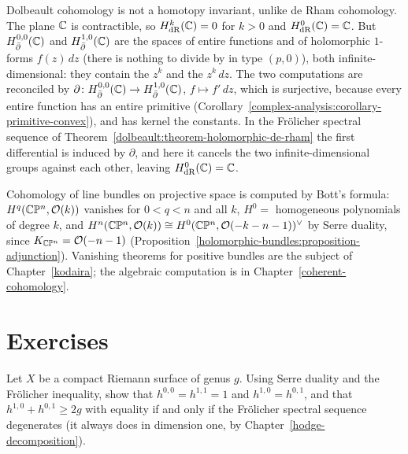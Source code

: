 \begin{counterexample}\label{dolbeault:counterexample-not-homotopy-invariant}
Dolbeault cohomology is not a homotopy invariant, unlike de Rham cohomology. The plane $\mathbb{C}$ is contractible, so $H^k_{\mathrm{dR}}(\mathbb{C}) = 0$ for $k > 0$ and $H^0_{\mathrm{dR}}(\mathbb{C}) = \mathbb{C}$. But
$H^{0,0}_{\bar\partial}(\mathbb{C})$ and $H^{1,0}_{\bar\partial}(\mathbb{C})$ are the spaces of entire functions and of holomorphic $1$-forms $f(z)\,dz$ (there is nothing to divide by in type $(p,0)$), both
infinite-dimensional: they contain the $z^k$ and the $z^k\,dz$. The two computations are reconciled by $\partial \colon H^{0,0}_{\bar\partial}(\mathbb{C}) \to H^{1,0}_{\bar\partial}(\mathbb{C})$, $f \mapsto f'\,dz$, which is
surjective, because every entire function has an entire primitive (Corollary~\ref{complex-analysis:corollary-primitive-convex}), and has kernel the constants. In the Fr\"olicher spectral sequence of Theorem~\ref{dolbeault:theorem-holomorphic-de-rham} the first differential is induced
by $\partial$, and here it cancels the two infinite-dimensional groups against each other, leaving $H^0_{\mathrm{dR}}(\mathbb{C}) = \mathbb{C}$.
\end{counterexample}

\begin{remark}\label{dolbeault:remark-vanishing}
Cohomology of line bundles on projective space is computed by Bott's formula: $H^q(\mathbb{C}\mathbb{P}^n, \mathcal{O}(k))$ vanishes for $0 < q < n$ and all $k$, $H^0 = $ homogeneous polynomials of degree $k$, and
$H^n(\mathbb{C}\mathbb{P}^n, \mathcal{O}(k)) \cong H^0(\mathbb{C}\mathbb{P}^n, \mathcal{O}(-k-n-1))^\vee$ by Serre duality, since $K_{\mathbb{C}\mathbb{P}^n} = \mathcal{O}(-n-1)$ (Proposition~\ref{holomorphic-bundles:proposition-adjunction}).
Vanishing theorems for positive bundles are the subject of Chapter~\ref{kodaira}; the algebraic computation is in Chapter~\ref{coherent-cohomology}.
\end{remark}

\section{Exercises}\label{dolbeault:section-exercises}

\begin{exercise}\label{dolbeault:exercise-riemann-surface}
Let $X$ be a compact Riemann surface of genus $g$. Using Serre duality and the Fr\"olicher inequality, show that $h^{0,0} = h^{1,1} = 1$ and $h^{1,0} = h^{0,1}$, and that $h^{1,0} + h^{0,1} \geq 2g$ with equality
if and only if the Fr\"olicher spectral sequence degenerates (it always does in dimension one, by Chapter~\ref{hodge-decomposition}).
\end{exercise}

